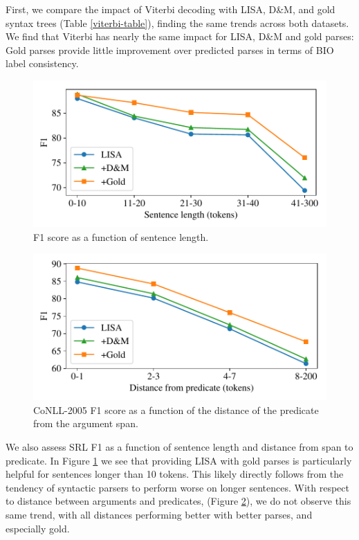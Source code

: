 \documentclass[11pt,a4paper]{article}
\begin{document}
First, we compare the impact of Viterbi decoding with LISA, D\&M, and gold syntax trees (Table \ref{viterbi-table}), finding the same trends across both datasets. We find that Viterbi has nearly the same impact for LISA, D\&M and gold parses: Gold parses provide little improvement over predicted parses in terms of BIO label consistency. 

\begin{figure}
\includegraphics[scale=0.52]{f1_by_sent_len.pdf}
\caption{F1 score as a function of sentence length.\label{fig:length}}
\end{figure}

\begin{figure}
\includegraphics[scale=0.52]{f1_by_pred_dist.pdf}
\caption{CoNLL-2005 F1 score as a function of the distance of the predicate from the argument span.\label{fig:dist}}
\end{figure}

We also assess SRL F1 as a function of sentence length and distance from span to predicate. In Figure \ref{fig:length} we see that providing LISA with gold parses is particularly helpful for sentences longer than 10 tokens. This likely directly follows from the tendency of syntactic parsers to perform worse on longer sentences. With respect to distance between arguments and predicates, (Figure \ref{fig:dist}), we do not observe this same trend, with all distances performing better with better parses, and especially gold. 
\end{document}
